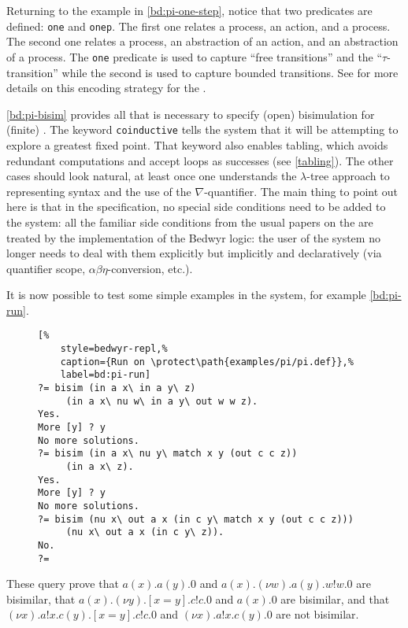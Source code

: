 \begin{figure}
  \centering
  
\end{figure}

\begin{figure}
  \centering
  
\end{figure}

Returning to the example in \autoref{bd:pi-one-step}, notice that two
predicates are defined: \lstinline{one} and \lstinline{onep}.  The first
one relates a process, an action, and a process.  The second one relates
a process, an abstraction of an action, and an abstraction of a process.
The \lstinline{one} predicate is used to capture ``free transitions''
and the ``$\tau$-transition'' while the second is used to capture
bounded transitions.  See \cite{tiu04fguc,tiu05concur} for more details
on this encoding strategy for the \pc{}.

\autoref{bd:pi-bisim} provides all that is necessary to specify (open)
bisimulation for (finite) \pc{}.  The keyword \lstinline{coinductive}
tells the system that it will be attempting to explore a greatest fixed
point.  That keyword also enables tabling, which avoids redundant
computations and accept loops as successes (see \autoref{tabling}).  The
other cases should look natural, at least once one understands the
$\lambda$-tree approach to representing syntax and the use of the
$\nabla$-quantifier.  The main thing to point out here is that in the
specification, no special side conditions need to be added to the
system: all the familiar side conditions from the usual papers on the
\pc{} are treated by the implementation of the Bedwyr logic: the user of
the system no longer needs to deal with them explicitly but implicitly
and declaratively (via quantifier scope, $\alpha\beta\eta$-conversion,
etc.).

It is now possible to test some simple examples in the system, for
example \autoref{bd:pi-run}.
\begin{figure}
  \centering
  \begin{lstlisting}[%
    style=bedwyr-repl,%
    caption={Run on \protect\path{examples/pi/pi.def}},%
    label=bd:pi-run]
?= bisim (in a x\ in a y\ z)
     (in a x\ nu w\ in a y\ out w w z).
Yes.
More [y] ? y
No more solutions.
?= bisim (in a x\ nu y\ match x y (out c c z))
     (in a x\ z).
Yes.
More [y] ? y
No more solutions.
?= bisim (nu x\ out a x (in c y\ match x y (out c c z)))
     (nu x\ out a x (in c y\ z)).
No.
?=
  \end{lstlisting}
\end{figure}
These query prove that $a(x).a(y).0$ and $a(x).(\nu w).a(y).w!w.0$ are
bisimilar, that $a(x).(\nu y).[x=y].c!c.0$ and $a(x).0$ are bisimilar,
and that $(\nu x).a!x.c(y).[x=y].c!c.0$ and $(\nu x).a!x.c(y).0$ are not
bisimilar.

